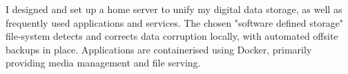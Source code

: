 \descript{ }
\vspace*{-\topsep}  %
\begin{justify}
I designed and set up a home server to unify my digital data storage, as well as frequently used applications and services.
The chosen "software defined storage" file-system detects and corrects data corruption locally, with automated offsite backups in place.
Applications are containerised using Docker, primarily providing media management and file serving.
\end{justify}